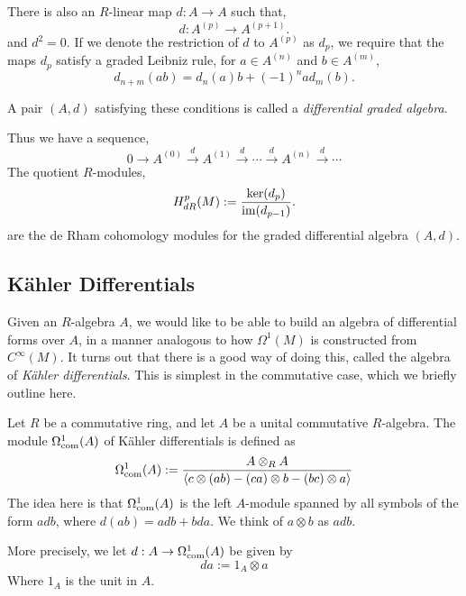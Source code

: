 There is also an $R$-linear map $d:A\rightarrow A$ such that,
\begin{equation*}
    d:A^{(p)}\rightarrow A^{(p+1)}.
\end{equation*}
and $d^2 = 0$.
If we denote the restriction of $d$ to $A^{(p)}$ as $d_p$, we
require that the maps $d_p$ satisfy a graded Leibniz rule, for $a \in A^{(n)}$
and $b \in A^{(m)}$,
\begin{equation*}
    d_{n+m}(ab) = d_n(a)b+(-1)^nad_m(b).
\end{equation*}

A pair $(A,d)$ satisfying these conditions is called a \emph{differential graded algebra}.

Thus we have a sequence,
\begin{equation*}
    0\rightarrow A^{(0)} \xrightarrow{d} A^{(1)} \xrightarrow{d} \cdots \xrightarrow{d} A^{(n)} \xrightarrow{d} \cdots
\end{equation*}
The quotient $R$-modules,
\begin{equation*}
    H^p_{dR}(M) := \frac{\ker(d_{p})}{\operatorname{im}(d_{p-1})}.
\end{equation*}
are the de Rham cohomology modules for the graded differential algebra $(A,d)$.
\subsection{K\"ahler Differentials}
Given an $R$-algebra $A$, we would like to be able to build an algebra
of differential forms over $A$, in a manner analogous to how $\Omega^1(M)$
is constructed from $C^\infty(M)$. It turns out that there is a good way of doing
this, called the algebra of \emph{K\"ahler differentials}. This is simplest in the commutative case,
which we briefly outline here.

Let $R$ be a commutative ring, and let $A$ be a unital commutative $R$-algebra. The module
$\Omega^1_{\operatorname{com}}(A)$
of K\"ahler differentials is defined as
\begin{equation*}
    \Omega^1_{\operatorname{com}}(A) := \frac{A\otimes_R A}{\langle c\otimes(ab)-(ca)\otimes b-(bc)\otimes a\rangle}
\end{equation*}
The idea here is that $\Omega^1_{\operatorname{com}}(A)$ is the left $A$-module spanned by all
symbols of the form $adb$, where $d(ab) = adb+bda$. We think of $a\otimes b$
as $adb$.

More precisely, we let $d:A\rightarrow \Omega^1_{\operatorname{com}}(A)$ be given by
\begin{equation*}
    da := 1_A\otimes a
\end{equation*}
Where $1_A$ is the unit in $A$.

